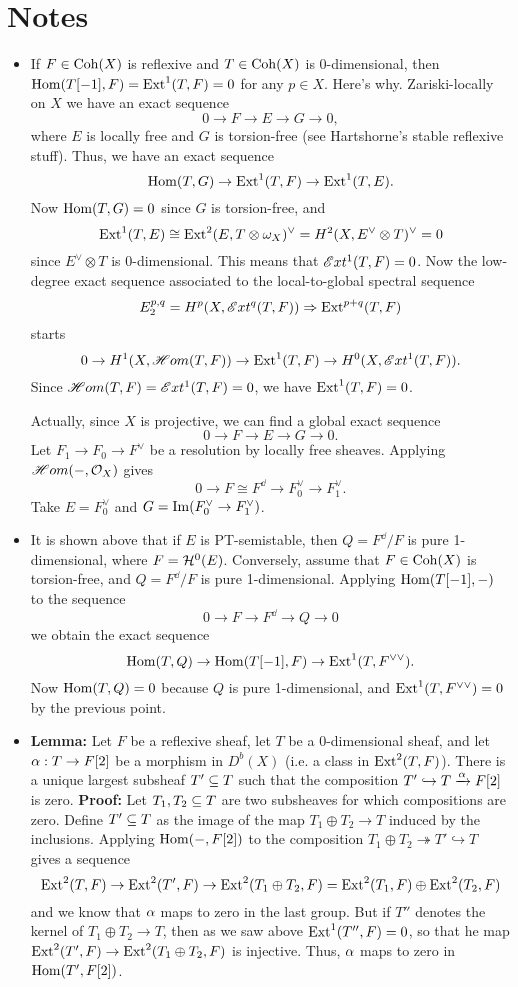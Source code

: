 \section{Notes}
\begin{itemize}
    \item If $F \in \operatorname{\mathrm{Coh}}(X)$ is reflexive and $T \in \operatorname{\mathrm{Coh}}(X)$ is 0-dimensional, then $\mathrm{Hom}(T[-1],F) = \mathrm{Ext}^1(T, F) = 0$ for any $p \in X$. Here's why. Zariski-locally on $X$ we have an exact sequence
    \[ 0 \to F \to E \to G \to 0, \]
    where $E$ is locally free and $G$ is torsion-free (see Hartshorne's stable reflexive stuff). Thus, we have an exact sequence
    \[ \mathrm{Hom}(T,G) \to \mathrm{Ext}^1(T, F) \to \mathrm{Ext}^1(T, E). \]
    Now $\mathrm{Hom}(T,G) = 0$ since $G$ is torsion-free, and
    \[ \mathrm{Ext}^1(T, E) \cong \mathrm{Ext}^2(E, T \otimes \omega_X)^\vee = H^2(X, E^\vee \otimes T)^\vee = 0 \]
    since $E^\vee \otimes T$ is 0-dimensional. This means that $\mathscr{E}xt^1(T, F) = 0$. Now the low-degree exact sequence associated to the local-to-global spectral sequence
    \[ E^{p,q}_2 = H^p(X, \mathscr{E}xt^q(T,F)) \Rightarrow \mathrm{Ext}^{p+q}(T, F) \]
    starts
    \[ 0 \to H^1(X, \mathscr{H}om(T, F)) \to \mathrm{Ext}^1(T, F) \to H^0(X, \mathscr{E}xt^1(T, F)). \]
    Since $\mathscr{H}om(T, F) = \mathscr{E}xt^1(T, F) = 0$, we have $\mathrm{Ext}^1(T, F) = 0$.
    
    Actually, since $X$ is projective, we can find a global exact sequence
    \[ 0 \to F \to E \to G \to 0. \]
    Let $F_1 \to F_0 \to F^\vee$ be a resolution by locally free sheaves. Applying $\mathscr{H}om(-,\mathcal{O}_X)$ gives
    \[ 0 \to F \cong F^\dd \to F_0^\vee \to F_1^\vee. \]
    Take $E = F_0^\vee$ and $G = \operatorname{\mathrm{Im}}(F_0^\vee \to F_1^\vee)$.
    
    \item It is shown above that if $E$ is PT-semistable, then $Q = F^\dd/F$ is pure 1-dimensional, where $F = \mathcal{H}^0(E)$. Conversely, assume that $F \in \operatorname{\mathrm{Coh}}(X)$ is torsion-free, and $Q = F^\dd/F$ is pure 1-dimensional. Applying $\mathrm{Hom}(T[-1], -)$ to the sequence
    \[ 0 \to F \to F^\dd \to Q \to 0 \]
    we obtain the exact sequence
    \[ \mathrm{Hom}(T, Q) \to \mathrm{Hom}(T[-1], F) \to \mathrm{Ext}^1(T, F^{\vee\vee}). \]
    Now $\mathrm{Hom}(T, Q) = 0$ because $Q$ is pure 1-dimensional, and $\mathrm{Ext}^1(T, F^{\vee\vee}) = 0$ by the previous point.
    
    \item \textbf{Lemma:} Let $F$ be a reflexive sheaf, let $T$ be a 0-dimensional sheaf, and let $\alpha: T \to F[2]$ be a morphism in $D^b(X)$ (i.e. a class in $\mathrm{Ext}^2(T,F)$). There is a unique largest subsheaf $T' \subseteq T$ such that the composition $T' \hookrightarrow T \xrightarrow{\alpha} F[2]$ is zero. \textbf{Proof:} Let $T_1, T_2 \subseteq T$ are two subsheaves for which compositions are zero. Define $T' \subseteq T$ as the image of the map $T_1 \oplus T_2 \to T$ induced by the inclusions. Applying $\mathrm{Hom}(-, F[2])$ to the composition $T_1 \oplus T_2 \twoheadrightarrow T' \hookrightarrow T$ gives a sequence
    \[ \mathrm{Ext}^2(T, F) \to \mathrm{Ext}^2(T', F) \to \mathrm{Ext}^2(T_1 \oplus T_2, F) = \mathrm{Ext}^2(T_1, F) \oplus \mathrm{Ext}^2(T_2, F) \]
    and we know that $\alpha$ maps to zero in the last group. But if $T''$ denotes the kernel of $T_1 \oplus T_2 \to T$, then as we saw above $\mathrm{Ext}^1(T'', F) = 0$, so that he map $\mathrm{Ext}^2(T', F) \to \mathrm{Ext}^2(T_1 \oplus T_2, F)$ is injective. Thus, $\alpha$ maps to zero in $\mathrm{Hom}(T', F[2])$. 
    

\end{itemize}
